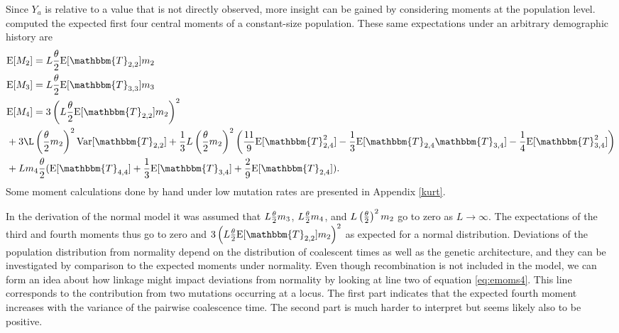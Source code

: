 Since $Y_a$ is relative to a value that is not directly observed, more insight
can be gained by considering moments at the population level.
~\citet{Schraiber2015} computed the expected first four central moments of a
constant-size population. These same expectations under an arbitrary demographic
history are
\begin{subequations} \label{eq:emoms}
\begin{align}
  &\E[M_2] = L \T \E[\mathbbm{T}_{2,2}] m_2 \label{eq:emoms2}\\
  &\E[M_3] = L \T \E[\mathbbm{T}_{3,3}] m_3  \label{eq:emoms3}\\
  &\E[M_4] = 3\left(L \T \E[\mathbbm{T}_{2,2}] m_2\right)^2 \nonumber \\
  &+ 3\L \left(\T m_2\right)^2\Var[\mathbbm{T}_{2,2}] + \frac{1}{3}
  L \left(\T m_2\right)^2
    \left( \frac{11}{9} \E[\mathbbm{T}_{2,4}^2]-\frac{1}{3}\E[\mathbbm{T}_{2,4}\mathbbm{T}_{3,4}]-
    \frac{1}{4}\E[\mathbbm{T}_{3,4}^2]\right) \nonumber \\
  &+ L m_4 \T ( \E[\mathbbm{T}_{4,4}] + \frac{1}{3} \E[\mathbbm{T}_{3,4}] +
    \frac{2}{9} \E[\mathbbm{T}_{2,4}] ).
  \label{eq:emoms4}
\end{align}
\end{subequations}
Some moment calculations done by hand under low mutation rates are presented in
Appendix \ref{kurt}.

In the derivation of the normal model it was assumed that
$L\frac{\theta}{2} m_3$, $L \frac{\theta}{2} m_4$, and $L \left( \frac{\theta}{2} \right)^2 m_2$ go to zero as $L\to
\infty$. The expectations of the third and fourth moments thus go to zero and
$3\left(L \T \E[\mathbbm{T}_{2,2}] m_2\right)^2$ as expected for a normal distribution.
Deviations of the population distribution from normality depend on the
distribution of coalescent times as well as the genetic architecture, and they
can be investigated by comparison to the expected moments under normality. Even
though recombination is not included in the model, we can form an idea about how
linkage might impact deviations from normality by looking at line two of
equation \eqref{eq:emoms4}. This line corresponds to the contribution from two
mutations occurring at a locus. The first part indicates that the expected
fourth moment increases with the variance of the pairwise coalescence time. The
second part is much harder to interpret but seems likely also to be positive.

